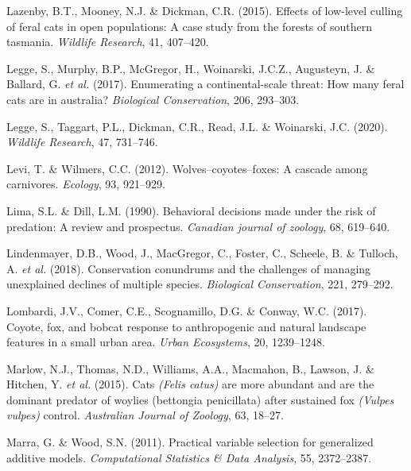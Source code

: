 \documentclass[11pt,a4paper,titlepage,twoside,openright]{style/unimelbthesis}
\begin{document}
\begin{mainmatter}
\leavevmode\hypertarget{ref-lazenby2015effects}{}%
Lazenby, B.T., Mooney, N.J. \& Dickman, C.R. (2015). Effects of low-level culling of feral cats in open populations: A case study from the forests of southern tasmania. \emph{Wildlife Research}, 41, 407--420.

\leavevmode\hypertarget{ref-legge2017enumerating}{}%
Legge, S., Murphy, B.P., McGregor, H., Woinarski, J.C.Z., Augusteyn, J. \& Ballard, G. \emph{et al.} (2017). Enumerating a continental-scale threat: How many feral cats are in australia? \emph{Biological Conservation}, 206, 293--303.

\leavevmode\hypertarget{ref-legge2020cat}{}%
Legge, S., Taggart, P.L., Dickman, C.R., Read, J.L. \& Woinarski, J.C. (2020). \emph{Wildlife Research}, 47, 731--746.

\leavevmode\hypertarget{ref-levi2012wolves}{}%
Levi, T. \& Wilmers, C.C. (2012). Wolves--coyotes--foxes: A cascade among carnivores. \emph{Ecology}, 93, 921--929.

\leavevmode\hypertarget{ref-lima1990behavioral}{}%
Lima, S.L. \& Dill, L.M. (1990). Behavioral decisions made under the risk of predation: A review and prospectus. \emph{Canadian journal of zoology}, 68, 619--640.

\leavevmode\hypertarget{ref-lindenmayer2018conservation}{}%
Lindenmayer, D.B., Wood, J., MacGregor, C., Foster, C., Scheele, B. \& Tulloch, A. \emph{et al.} (2018). Conservation conundrums and the challenges of managing unexplained declines of multiple species. \emph{Biological Conservation}, 221, 279--292.

\leavevmode\hypertarget{ref-lombardi2017coyote}{}%
Lombardi, J.V., Comer, C.E., Scognamillo, D.G. \& Conway, W.C. (2017). Coyote, fox, and bobcat response to anthropogenic and natural landscape features in a small urban area. \emph{Urban Ecosystems}, 20, 1239--1248.

\leavevmode\hypertarget{ref-marlow2015cats}{}%
Marlow, N.J., Thomas, N.D., Williams, A.A., Macmahon, B., Lawson, J. \& Hitchen, Y. \emph{et al.} (2015). Cats \emph{(Felis catus)} are more abundant and are the dominant predator of woylies (bettongia penicillata) after sustained fox \emph{(Vulpes vulpes)} control. \emph{Australian Journal of Zoology}, 63, 18--27.

\leavevmode\hypertarget{ref-marra2011practical}{}%
Marra, G. \& Wood, S.N. (2011). Practical variable selection for generalized additive models. \emph{Computational Statistics \& Data Analysis}, 55, 2372--2387.


\end{mainmatter}
\end{document}
